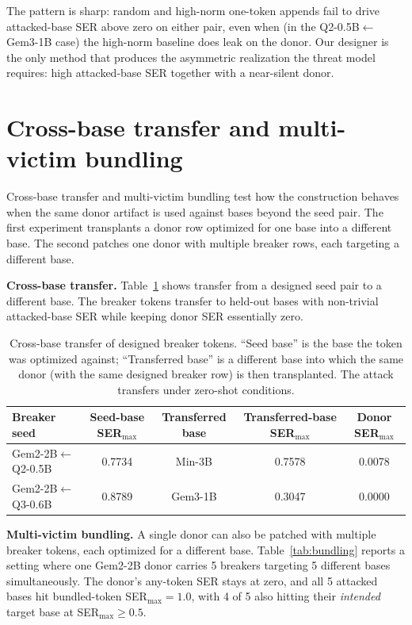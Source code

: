 The pattern is sharp: random and high-norm one-token appends fail to drive attacked-base SER above zero on either pair, even when (in the Q2-0.5B$\leftarrow$Gem3-1B case) the high-norm baseline does leak on the donor. Our designer is the only method that produces the asymmetric realization the threat model requires: high attacked-base SER together with a near-silent donor.

\section{Cross-base transfer and multi-victim bundling}
\label{app:transfer_bundling}

Cross-base transfer and multi-victim bundling test how the construction behaves when the same donor artifact is used against bases beyond the seed pair. The first experiment transplants a donor row optimized for one base into a different base. The second patches one donor with multiple breaker rows, each targeting a different base.

\noindent\textbf{Cross-base transfer.}
Table~\ref{tab:cross-base} shows transfer from a designed seed pair to a different base. The breaker tokens transfer to held-out bases with non-trivial attacked-base SER while keeping donor SER essentially zero.

\begin{table}[!htbp]
\centering
\small
\caption{Cross-base transfer of designed breaker tokens. ``Seed base'' is the base the token was optimized against; ``Transferred base'' is a different base into which the same donor (with the same designed breaker row) is then transplanted. The attack transfers under zero-shot conditions.}
\label{tab:cross-base}
\begin{tabular}{lcccc}
\toprule
Breaker seed & Seed-base SER$_{\max}$ & Transferred base & Transferred-base SER$_{\max}$ & Donor SER$_{\max}$ \\
\midrule
Gem2-2B$\leftarrow$Q2-0.5B & 0.7734 & Min-3B  & 0.7578 & 0.0078 \\
Gem2-2B$\leftarrow$Q3-0.6B & 0.8789 & Gem3-1B & 0.3047 & 0.0000 \\
\bottomrule
\end{tabular}
\end{table}

\noindent\textbf{Multi-victim bundling.}
A single donor can also be patched with multiple breaker tokens, each optimized for a different base. Table~\ref{tab:bundling} reports a setting where one Gem2-2B donor carries 5 breakers targeting 5 different bases simultaneously. The donor's any-token SER stays at zero, and all 5 attacked bases hit bundled-token SER$_{\max}{=}1.0$, with 4 of 5 also hitting their \emph{intended} target base at SER$_{\max}\ge 0.5$.

